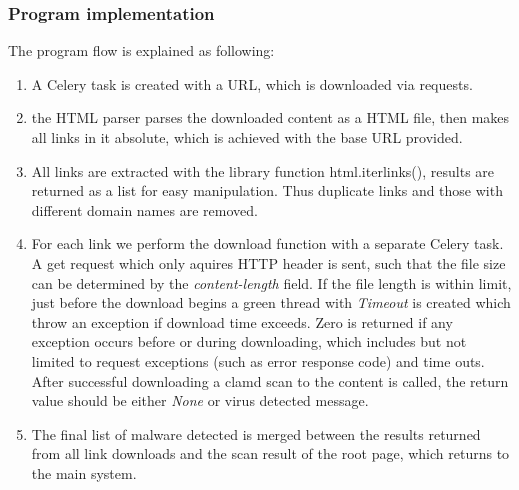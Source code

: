 \subsubsection{Program implementation}
The program flow is explained as following:
\begin{enumerate}
\item A Celery task is created with a URL, which is downloaded via requests. 
\item the HTML parser parses the downloaded content as a HTML file, then makes 
all links in it absolute, which is achieved with the base URL provided. 
\item All links are extracted with the library function html.iterlinks(), 
results are returned as a list for easy manipulation. Thus duplicate links and 
those with different domain names are removed.
\item For each link we perform the download function with a separate Celery 
task. A get request which only 
aquires HTTP header is sent, such that the file size can be determined by the 
{\em content-length} field. If the file length is within limit, just before 
the download begins a green thread with {\em Timeout} is created which throw
an exception if download time exceeds. Zero is returned if any exception 
occurs before or during downloading, which includes but not limited to request 
exceptions (such as error response code) and time outs. After successful 
downloading a clamd scan to the content is called, the return value should be 
either {\em None} or virus detected message. 
\item The final list of malware detected is merged between the results 
returned from all link downloads and the scan result of the root page, which 
returns to the main system.  
\end{enumerate}

